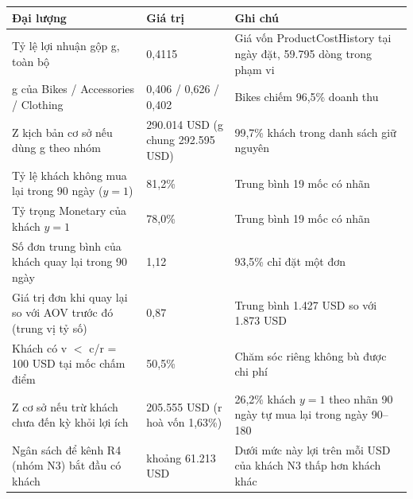 \begin{tabular}{p{4.6cm}p{3.6cm}p{6.2cm}}
\toprule
Đại lượng & Giá trị & Ghi chú \\
\midrule
Tỷ lệ lợi nhuận gộp g, toàn bộ & 0,4115 & Giá vốn ProductCostHistory tại ngày đặt, 59.795 dòng trong phạm vi \\
g của Bikes / Accessories / Clothing & 0,406 / 0,626 / 0,402 & Bikes chiếm 96,5\% doanh thu \\
Z kịch bản cơ sở nếu dùng g theo nhóm & 290.014 USD (g chung 292.595 USD) & 99,7\% khách trong danh sách giữ nguyên \\
Tỷ lệ khách không mua lại trong 90 ngày ($y=1$) & 81,2\% & Trung bình 19 mốc có nhãn \\
Tỷ trọng Monetary của khách $y=1$ & 78,0\% & Trung bình 19 mốc có nhãn \\
Số đơn trung bình của khách quay lại trong 90 ngày & 1,12 & 93,5\% chỉ đặt một đơn \\
Giá trị đơn khi quay lại so với AOV trước đó (trung vị tỷ số) & 0,87 & Trung bình 1.427 USD so với 1.873 USD \\
Khách có v $<$ c/r = 100 USD tại mốc chấm điểm & 50,5\% & Chăm sóc riêng không bù được chi phí \\
Z cơ sở nếu trừ khách chưa đến kỳ khỏi lợi ích & 205.555 USD (r hoà vốn 1,63\%) & 26,2\% khách $y=1$ theo nhãn 90 ngày tự mua lại trong ngày 90–180 \\
Ngân sách để kênh R4 (nhóm N3) bắt đầu có khách & khoảng 61.213 USD & Dưới mức này lợi trên mỗi USD của khách N3 thấp hơn khách khác \\
\bottomrule
\end{tabular}
